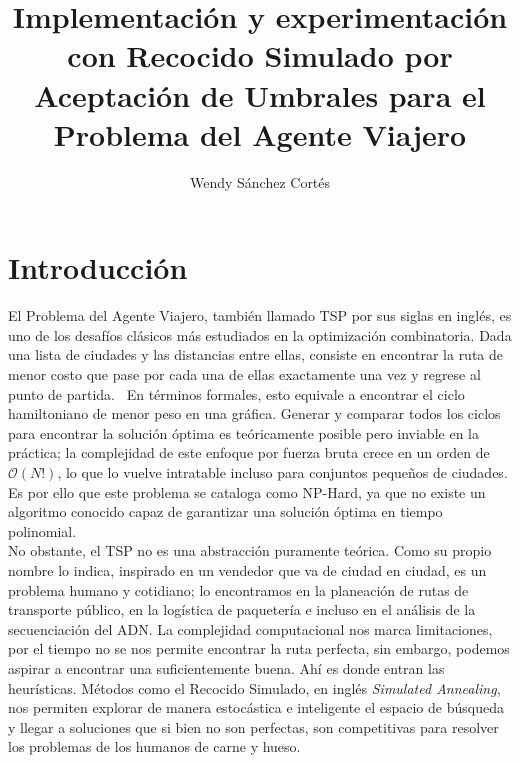 \documentclass[9pt,a4paper,twocolumn,twoside]{rho-class/rho}
\title{Implementación y experimentación con Recocido Simulado por Aceptación de Umbrales para el Problema del Agente Viajero}
\author[{\textasteriskcentered},a]{Wendy Sánchez Cortés}
\affil[a]{Facultad de Ciencias, Universidad Nacional Autónoma de México}
\begin{document}
\maketitle

\section{Introducción}
El Problema del Agente Viajero, también llamado TSP por sus siglas en inglés, es uno de
los desafíos clásicos más estudiados en la optimización combinatoria. Dada una lista de
ciudades y las distancias entre ellas, consiste en encontrar la ruta de menor costo que
pase por cada una de ellas exactamente una vez y regrese al punto de partida.~\cite{kirkpatrick1983}
En términos formales, esto equivale a encontrar el ciclo hamiltoniano de menor peso en una
gráfica. Generar y comparar todos los ciclos para encontrar la solución óptima es teóricamente
posible pero inviable en la práctica; la complejidad de este enfoque por fuerza bruta crece en
un orden de $\mathcal{O}(N!)$, lo que lo vuelve intratable incluso para conjuntos pequeños de
ciudades. Es por ello que este problema se cataloga como NP-Hard, ya que no existe un algoritmo
conocido capaz de garantizar una solución óptima en tiempo polinomial.\\


No obstante, el TSP no es una abstracción puramente teórica. Como su propio nombre lo indica,
inspirado en un vendedor que va de ciudad en ciudad, es un problema humano y cotidiano;
lo encontramos en la planeación de rutas de transporte público, en la logística de paquetería
e incluso en el análisis de la secuenciación del ADN. La complejidad computacional nos marca 
limitaciones, por el tiempo no se nos permite encontrar la ruta perfecta, sin embargo, podemos
aspirar a encontrar una suficientemente buena. Ahí es donde entran las heurísticas. Métodos 
como el Recocido Simulado, en inglés \textit{Simulated Annealing}, nos permiten explorar de
manera estocástica e inteligente el espacio de búsqueda y llegar a soluciones que si bien no
son perfectas, son competitivas para resolver los problemas de los humanos de carne y hueso.\\
\end{document}
